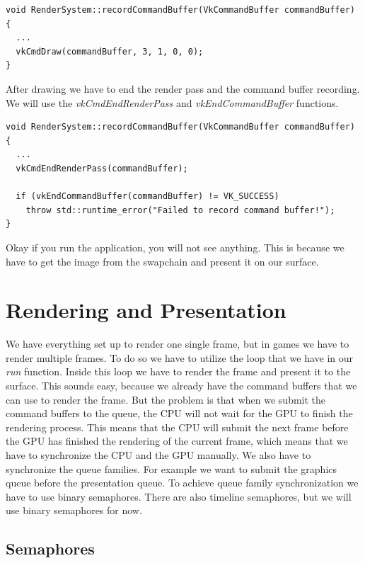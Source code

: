 \documentclass[12pt]{report} \usepackage{preamble}
\begin{document}
\begin{lstlisting}[Language=C++]
void RenderSystem::recordCommandBuffer(VkCommandBuffer commandBuffer) {
  ...
  vkCmdDraw(commandBuffer, 3, 1, 0, 0);
}
\end{lstlisting}

After drawing we have to end the render pass and the command buffer recording. We will use the \textit{vkCmdEndRenderPass} and
\textit{vkEndCommandBuffer} functions.

\begin{lstlisting}[Language=C++]
void RenderSystem::recordCommandBuffer(VkCommandBuffer commandBuffer) {
  ...
  vkCmdEndRenderPass(commandBuffer);

  if (vkEndCommandBuffer(commandBuffer) != VK_SUCCESS)
    throw std::runtime_error("Failed to record command buffer!");
}
\end{lstlisting}

Okay if you run the application, you will not see anything. This is because we have to get the image from the swapchain and
present it on our surface.

\section{Rendering and Presentation}

We have everything set up to render one single frame, but in games we have to render multiple frames. To do so we have to
utilize the loop that we have in our \textit{run} function. Inside this loop we have to render the frame and present it to the
surface. This sounds easy, because we already have the command buffers that we can use to render the frame. But the problem is that
when we submit the command buffers to the queue, the CPU will not wait for the GPU to finish the rendering process. This means that
the CPU will submit the next frame before the GPU has finished the rendering of the current frame, which means that we have
to synchronize the CPU and the GPU manually. We also have to synchronize the queue families. For example we want to submit the
graphics queue before the presentation queue. To achieve queue family synchronization we have to use binary semaphores. There are
also timeline semaphores, but we will use binary semaphores for now.

\subsection{Semaphores}
\end{document}
